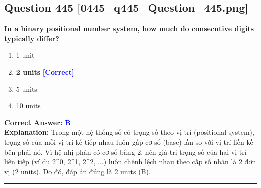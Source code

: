 \documentclass[11pt,a4paper]{article}
\begin{document}
\begin{minipage}{\textwidth}
\subsection*{Question 445 \quad \footnotesize{[0445\_q445\_Question\_445.png]}}
\noindent \textbf{In a binary positional number system, how much do consecutive digits typically differ?}

\begin{enumerate}[label=\Alph*.]
    \item 1 unit
    \item \textbf{2 units} \hfill \textcolor{blue}{\textbf{[Correct]}}
    \item 5 units
    \item 10 units
\end{enumerate}

\noindent \textbf{Correct Answer:} \textcolor{blue}{\textbf{B}} \\[2pt]
\noindent \textbf{Explanation:} Trong một hệ thống số có trọng số theo vị trí (positional system), trọng số của mỗi vị trí kế tiếp nhau luôn gấp cơ số (base) lần so với vị trí liền kề bên phải nó. Vì hệ nhị phân có cơ số bằng 2, nên giá trị trọng số của hai vị trí liên tiếp (ví dụ 2\textasciicircum{}0, 2\textasciicircum{}1, 2\textasciicircum{}2, ...) luôn chênh lệch nhau theo cấp số nhân là 2 đơn vị (2 units). Do đó, đáp án đúng là 2 units (B).

\par\vspace{0.3cm}
\hrule
\vspace{0.3cm}
\end{minipage}
\end{document}
